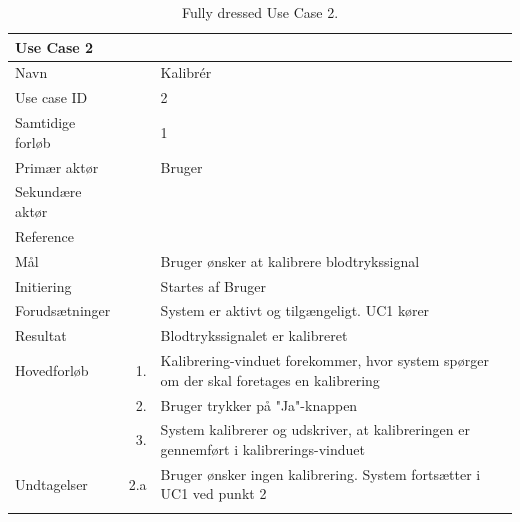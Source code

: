 \begin{longtabu} to  %
    {\large \textbf{Use Case 2}} && \\
    \toprule
    Navn &&    Kalibrér\\
    Use case ID &&    2\\
    Samtidige forløb &&    1\\
    Primær aktør &&    Bruger\\
    Sekundære aktør &&	 \\
    Reference &&      \\
    Mål &&    Bruger ønsker at kalibrere blodtrykssignal\\
    Initiering &&	Startes af Bruger\\
    Forudsætninger &&  System er aktivt og tilgængeligt. UC1 kører\\
    Resultat &&		Blodtrykssignalet er kalibreret                         \\ \midrule
    Hovedforløb &    1. &	 Kalibrering-vinduet forekommer, hvor system spørger om der skal foretages en kalibrering\\[-1ex]  				
    			&    2. &    Bruger trykker på "Ja"\--knappen\\
                &    3.	&	 System kalibrerer og udskriver, at kalibreringen er gennemført i kalibrerings-vinduet \newline\\ \midrule
                
    Undtagelser &    2.a &   Bruger ønsker ingen kalibrering. System fortsætter i UC1 ved punkt 2  \\ \bottomrule
\caption{Fully dressed Use Case 2.}
\label{UC2}
\end{longtabu}


